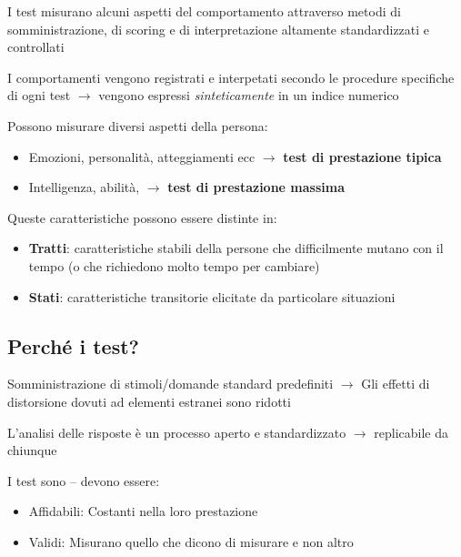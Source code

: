 \documentclass[compress]{beamer}
\begin{document}
\begin{frame}
	I test misurano alcuni aspetti del comportamento attraverso metodi di somministrazione, di scoring e di interpretazione altamente standardizzati e controllati 
	
	I comportamenti vengono registrati e interpetati secondo le procedure specifiche di ogni test $\rightarrow$ vengono espressi \emph{sinteticamente} in un indice numerico
	
	Possono misurare diversi aspetti della persona: 
	\begin{itemize}
		\item Emozioni, personalità, atteggiamenti ecc $\rightarrow$ \textbf{test di prestazione tipica}
		\item Intelligenza, abilità, $\rightarrow$ \textbf{test di prestazione massima} 
	\end{itemize}
	
	Queste caratteristiche possono essere distinte in: 
	
	\begin{itemize}
		\item \textbf{Tratti}: caratteristiche stabili della persone che difficilmente mutano con il tempo (o che richiedono molto tempo per cambiare)
		\item  \textbf{Stati}: caratteristiche transitorie elicitate da particolare situazioni
	\end{itemize}
\end{frame}

	\subsection{Perché i test?}

\begin{frame}
	Somministrazione di stimoli/domande standard predefiniti $\rightarrow$ Gli effetti di distorsione dovuti ad elementi estranei sono ridotti 
	
	\vspace{2mm}
	L'analisi delle risposte è un processo aperto e standardizzato $\rightarrow$ replicabile da chiunque
	
	\vspace{2mm}
	I test sono -- devono essere: 
	
	\begin{itemize}
		\item Affidabili: Costanti nella loro prestazione
		\item Validi: Misurano quello che dicono di misurare e non altro
	\end{itemize}
\end{frame}
\end{document}
